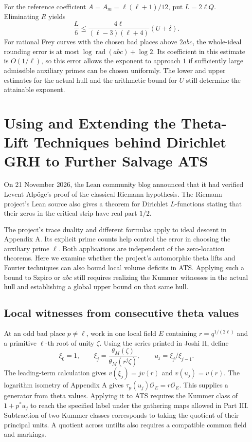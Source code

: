 \documentclass[UTF8,fontset=none,zihao=-4,a4paper]{ctexart}
\newcommand{\OO}{\mathcal O}
\newcommand{\rad}{\operatorname{rad}}
\begin{document}
For the reference coefficient \(A=A_m=\ell(\ell+1)/12\), put \(L=2\ell Q\). Eliminating \(R\) yields
\[
 \frac L6\le\frac{4\ell}{(\ell-3)(\ell+4)}(U+\delta).
\]
For rational Frey curves with the chosen bad places above \(2abc\), the whole-ideal rounding error is at most \(\log\rad(abc)+\log 2\). Its coefficient in this estimate is \(O(1/\ell)\), so this error allows the exponent to approach \(1\) if sufficiently large admissible auxiliary primes can be chosen uniformly. The lower and upper estimates for the actual hull and the arithmetic bound for \(U\) still determine the attainable exponent.

\section[Theta Lifts and ATS]{Using and Extending the Theta-Lift Techniques behind Dirichlet GRH to Further Salvage ATS}

On 21 November 2026, the Lean community blog announced that it had verified Levent Alpöge's proof of the classical Riemann hypothesis. The Riemann project's Lean source also gives a theorem for Dirichlet \(L\)-functions stating that their zeros in the critical strip have real part \(1/2\).\cite{riemblog,riemcode}

The project's trace duality and different formulas apply to ideal descent in Appendix A. Its explicit prime counts help control the error in choosing the auxiliary prime \(\ell\). Both applications are independent of the zero-location theorems. Here we examine whether the project's automorphic theta lifts and Fourier techniques can also bound local volume deficits in ATS. Applying such a bound to Szpiro or \(abc\) still requires realizing the Kummer witnesses in the actual hull and establishing a global upper bound on that same hull.\cite{riemcode,riemtheta}

\subsection{Local witnesses from consecutive theta values}
At an odd bad place \(p\ne\ell\), work in one local field \(E\) containing \(r=q^{1/(2\ell)}\) and a primitive \(\ell\)-th root of unity \(\zeta\). Using the series printed in Joshi II, define
\[
 \xi_0=1,\qquad \xi_j=\frac{\theta_M(\zeta)}{\theta_M(r^j\zeta)},\qquad
 u_j=\xi_j/\xi_{j-1}.
\]
The leading-term calculation gives \(v(\xi_j)=jv(r)\) and \(v(u_j)=v(r)\). The logarithm isometry of Appendix A gives \(\tau_p(u_j)\OO_E=r\OO_E\). This supplies a generator from theta values. Applying it to ATS requires the Kummer class of \(1+p^*u_j\) to reach the specified label under the gathering maps allowed in Part III. Subtraction of two Kummer classes corresponds to taking the quotient of their principal units. A quotient across untilts also requires a compatible common field and markings.\cite{jii,jiii}
\end{document}

